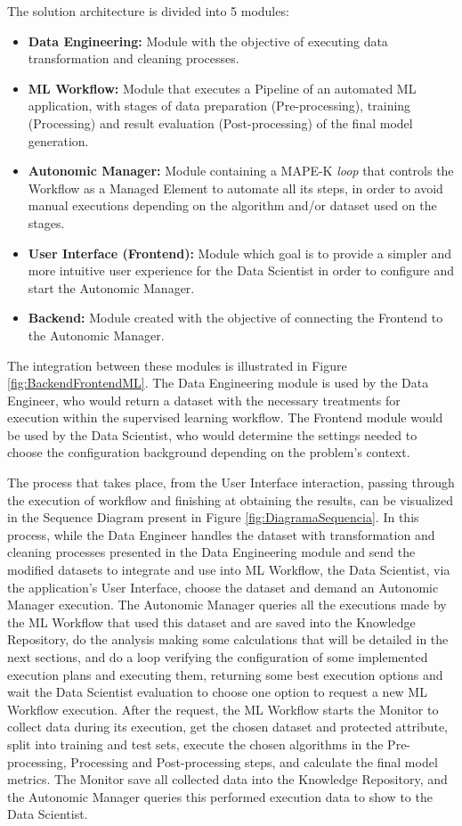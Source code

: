 \documentclass[10pt,conference]{IEEEtran}
\begin{document}
The solution architecture is divided into 5 modules:

\begin{itemize}
    \item {\textbf{Data Engineering:}} Module with the objective of executing data transformation and cleaning processes.
	\item {\textbf{ML Workflow:}} Module that executes a Pipeline of an automated ML application, with stages of data preparation (Pre-processing), training (Processing) and result evaluation (Post-processing) of the final model generation.
     \item {\textbf{Autonomic Manager:}} Module containing a MAPE-K \textit{loop} that controls the Workflow as a Managed Element to automate all its steps, in order to avoid manual executions depending on the algorithm and/or dataset used on the stages.
     \item {\textbf{User Interface (Frontend):}} Module which goal is to provide a simpler and more intuitive user experience for the Data Scientist in order to configure and start the Autonomic Manager.
	\item {\textbf{Backend:}} Module created with the objective of connecting the Frontend to the Autonomic Manager.
\end{itemize}

The integration between these modules is illustrated in Figure \ref{fig:BackendFrontendML}. The Data Engineering module is used by the Data Engineer, who would return a dataset with the necessary treatments for execution within the supervised learning workflow. The Frontend module would be used by the Data Scientist, who would determine the settings needed to choose the configuration background depending on the problem's context. 

The process that takes place, from the User Interface interaction, passing through the execution of workflow and finishing at obtaining the results, can be visualized in the Sequence Diagram present in Figure \ref{fig:DiagramaSequencia}. In this process, while the Data Engineer handles the dataset with transformation and cleaning processes presented in the Data Engineering module and send the modified datasets to integrate and use into ML Workflow, the Data Scientist, via the application's User Interface, choose the dataset and demand an Autonomic Manager execution. The Autonomic Manager queries all the executions made by the ML Workflow that used this dataset and are saved into the Knowledge Repository, do the analysis making some calculations that will be detailed in the next sections, and do a loop verifying the configuration of some implemented execution plans and executing them, returning some best execution options and wait the Data Scientist evaluation to choose one option to request a new ML Workflow execution. After the request, the ML Workflow starts the Monitor to collect data during its execution, get the chosen dataset and protected attribute, split into training and test sets, execute the chosen algorithms in the Pre-processing, Processing and Post-processing steps, and calculate the final model metrics. The Monitor save all collected data into the Knowledge Repository, and the Autonomic Manager queries this performed execution data to show to the Data Scientist.
\end{document}
